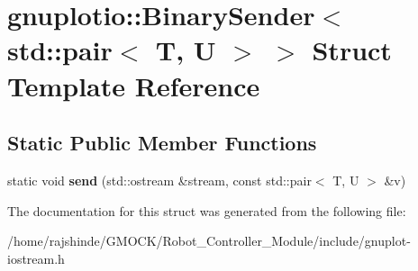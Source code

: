 \hypertarget{structgnuplotio_1_1_binary_sender_3_01std_1_1pair_3_01_t_00_01_u_01_4_01_4}{}\section{gnuplotio\+:\+:Binary\+Sender$<$ std\+:\+:pair$<$ T, U $>$ $>$ Struct Template Reference}
\label{structgnuplotio_1_1_binary_sender_3_01std_1_1pair_3_01_t_00_01_u_01_4_01_4}
\subsection*{Static Public Member Functions}
\begin{DoxyCompactItemize}
\item 
static void {\bfseries send} (std\+::ostream \&stream, const std\+::pair$<$ T, U $>$ \&v)\hypertarget{structgnuplotio_1_1_binary_sender_3_01std_1_1pair_3_01_t_00_01_u_01_4_01_4_a9d949c8e7b1dea493288b0a2dd95cbff}{}\label{structgnuplotio_1_1_binary_sender_3_01std_1_1pair_3_01_t_00_01_u_01_4_01_4_a9d949c8e7b1dea493288b0a2dd95cbff}

\end{DoxyCompactItemize}


The documentation for this struct was generated from the following file\+:\begin{DoxyCompactItemize}
\item 
/home/rajshinde/\+G\+M\+O\+C\+K/\+Robot\+\_\+\+Controller\+\_\+\+Module/include/gnuplot-\/iostream.\+h\end{DoxyCompactItemize}
